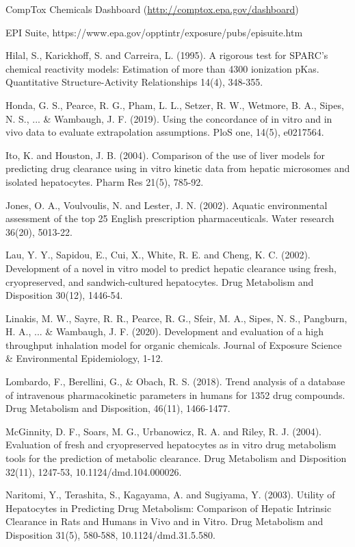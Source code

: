 \documentclass[a4paper]{book}
\begin{document}
\begin{References}\relax
CompTox Chemicals Dashboard (\url{http://comptox.epa.gov/dashboard})

EPI Suite, https://www.epa.gov/opptintr/exposure/pubs/episuite.htm

Hilal, S., Karickhoff, S. and Carreira, L. (1995). A rigorous test for
SPARC's chemical reactivity models: Estimation of more than 4300 ionization
pKas. Quantitative Structure-Activity Relationships 14(4), 348-355.

Honda, G. S., Pearce, R. G., Pham, L. L., Setzer, R. W., Wetmore, B. A., 
Sipes, N. S., ... \& Wambaugh, J. F. (2019). Using the concordance of in 
vitro and in vivo data to evaluate extrapolation assumptions. PloS one, 
14(5), e0217564.

Ito, K. and Houston, J. B. (2004). Comparison of the use of liver models for
predicting drug clearance using in vitro kinetic data from hepatic
microsomes and isolated hepatocytes. Pharm Res 21(5), 785-92.

Jones, O. A., Voulvoulis, N. and Lester, J. N. (2002). Aquatic environmental
assessment of the top 25 English prescription pharmaceuticals. Water
research 36(20), 5013-22.

Lau, Y. Y., Sapidou, E., Cui, X., White, R. E. and Cheng, K. C. (2002).
Development of a novel in vitro model to predict hepatic clearance using
fresh, cryopreserved, and sandwich-cultured hepatocytes. Drug Metabolism and
Disposition 30(12), 1446-54.

Linakis, M. W., Sayre, R. R., Pearce, R. G., Sfeir, M. A., Sipes, N. S., 
Pangburn, H. A., ... \& Wambaugh, J. F. (2020). Development and evaluation of 
a high throughput inhalation model for organic chemicals. Journal of 
Exposure Science \& Environmental Epidemiology, 1-12.

Lombardo, F., Berellini, G., \& Obach, R. S. (2018). Trend analysis of a 
database of intravenous pharmacokinetic parameters in humans for 1352 drug 
compounds. Drug Metabolism and Disposition, 46(11), 1466-1477.

McGinnity, D. F., Soars, M. G., Urbanowicz, R. A. and Riley, R. J. (2004).
Evaluation of fresh and cryopreserved hepatocytes as in vitro drug
metabolism tools for the prediction of metabolic clearance. Drug Metabolism
and Disposition 32(11), 1247-53, 10.1124/dmd.104.000026.

Naritomi, Y., Terashita, S., Kagayama, A. and Sugiyama, Y. (2003). Utility
of Hepatocytes in Predicting Drug Metabolism: Comparison of Hepatic
Intrinsic Clearance in Rats and Humans in Vivo and in Vitro. Drug Metabolism
and Disposition 31(5), 580-588, 10.1124/dmd.31.5.580.


\end{References}
\end{document}
